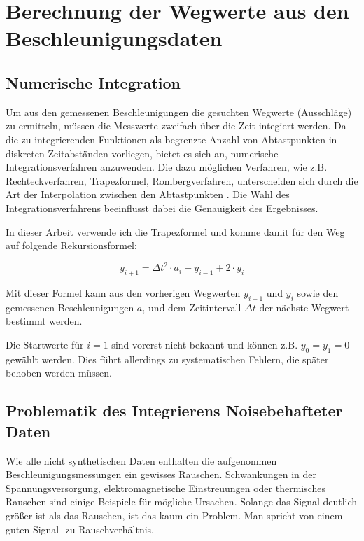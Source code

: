 \documentclass[12pt,a4paper]{scrartcl}
\begin{document}
\newpage

\section{Berechnung der Wegwerte aus den Beschleunigungsdaten}

\subsection{Numerische Integration}

Um aus den gemessenen Beschleunigungen die gesuchten Wegwerte (Ausschläge) zu ermitteln, müssen die Messwerte zweifach über die Zeit integiert werden. Da die zu integrierenden Funktionen als begrenzte Anzahl von Abtastpunkten in diskreten Zeitabständen vorliegen, bietet es sich an, numerische Integrationsverfahren anzuwenden. Die dazu möglichen Verfahren, wie z.B. Rechteckverfahren, Trapezformel, Rombergverfahren, unterscheiden sich durch die Art der Interpolation zwischen den Abtastpunkten \citep[S. 760ff]{Bronstein:1995fk}. Die Wahl des Integrationsverfahrens beeinflusst dabei die Genauigkeit des Ergebnisses.

In dieser Arbeit verwende ich die Trapezformel und komme damit für den Weg auf folgende Rekursionsformel:

\begin{equation}
y_{i+1} = \Delta t^2 \cdot a_i - y_{i-1} + 2 \cdot y_i
\end{equation}

Mit dieser Formel kann aus den vorherigen Wegwerten $y_{i-1}$ und $y_i$ sowie den gemessenen Beschleunigungen $a_i$ und dem Zeitintervall $\Delta t$ der nächste Wegwert bestimmt werden.

Die Startwerte für $i=1$ sind vorerst nicht bekannt und können z.B. $y_0 = y_1 = 0$ gewählt werden. Dies führt allerdings zu systematischen Fehlern, die später behoben werden müssen.


\subsection{Problematik des Integrierens Noisebehafteter Daten}

Wie alle nicht synthetischen Daten enthalten die aufgenommen Beschleunigungsmessungen ein gewisses Rauschen. Schwankungen in der Spannungsversorgung, elektromagnetische Einstreuungen oder thermisches Rauschen sind einige Beispiele für mögliche Ursachen. Solange das Signal deutlich größer ist als das Rauschen, ist das kaum ein Problem. Man spricht von einem guten Signal- zu Rauschverhältnis. 
\end{document}
